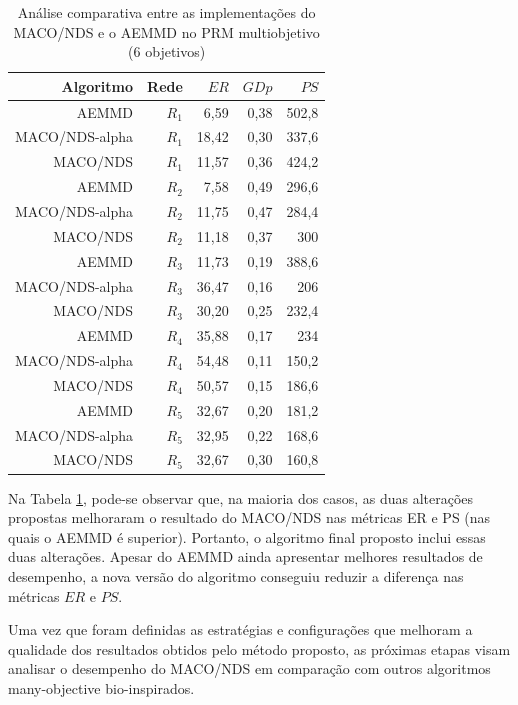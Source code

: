 \begin{table}[!htbp]
	\centering
	\caption{Análise comparativa entre as implementações do MACO/NDS e o AEMMD no PRM multiobjetivo (6 objetivos)}
	\label{tab_exp2_macod_simples}
	\begin{tabular}{rrrrr}
		Algoritmo  & Rede  & $ER$  & $GDp$ & $PS$  \\ \hline
		AEMMD      & $R_1$ & 6,59  & 0,38 & 502,8 \\
		MACO/NDS-alpha & $R_1$ & 18,42 & 0,30 & 337,6 \\
		MACO/NDS     & $R_1$ & 11,57 & 0,36 & 424,2 \\ \hline
		AEMMD      & $R_2$ & 7,58  & 0,49 & 296,6 \\
		MACO/NDS-alpha & $R_2$ & 11,75 & 0,47 & 284,4 \\
		MACO/NDS     & $R_2$ & 11,18 & 0,37 & 300   \\ \hline
		AEMMD      & $R_3$ & 11,73 & 0,19 & 388,6 \\
		MACO/NDS-alpha & $R_3$ & 36,47 & 0,16 & 206   \\
		MACO/NDS     & $R_3$ & 30,20 & 0,25 & 232,4 \\ \hline
		AEMMD      & $R_4$ & 35,88 & 0,17 & 234   \\
		MACO/NDS-alpha & $R_4$ & 54,48 & 0,11 & 150,2 \\
		MACO/NDS     & $R_4$ & 50,57 & 0,15 & 186,6 \\ \hline
		AEMMD      & $R_5$ & 32,67 & 0,20 & 181,2 \\
		MACO/NDS-alpha & $R_5$ & 32,95 & 0,22 & 168,6 \\
		MACO/NDS     & $R_5$ & 32,67 & 0,30 & 160,8
	\end{tabular}
\end{table}

Na Tabela \ref{tab_exp2_macod_simples}, pode-se observar que, na maioria dos casos, as duas alterações propostas melhoraram o resultado do MACO/NDS nas métricas ER e PS (nas quais o AEMMD é superior). Portanto, o algoritmo final proposto inclui essas duas alterações. Apesar do AEMMD ainda apresentar melhores resultados de desempenho, a nova versão do algoritmo conseguiu reduzir a diferença nas métricas $ER$ e $PS$.

Uma vez que foram definidas as estratégias e configurações que melhoram a qualidade dos resultados obtidos pelo método proposto, as próximas etapas visam analisar o desempenho do MACO/NDS em comparação com outros algoritmos many-objective bio-inspirados.

